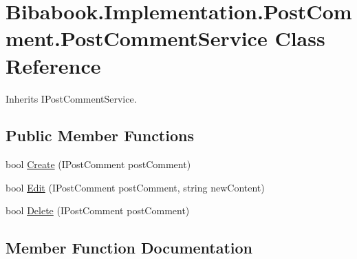\hypertarget{class_bibabook_1_1_implementation_1_1_post_comment_1_1_post_comment_service}{}\section{Bibabook.\+Implementation.\+Post\+Comment.\+Post\+Comment\+Service Class Reference}
\label{class_bibabook_1_1_implementation_1_1_post_comment_1_1_post_comment_service}


Inherits I\+Post\+Comment\+Service.

\subsection*{Public Member Functions}
\begin{DoxyCompactItemize}
\item 
bool \hyperlink{class_bibabook_1_1_implementation_1_1_post_comment_1_1_post_comment_service_a69d9cb1bd34cc3470638e13307962227}{Create} (I\+Post\+Comment post\+Comment)
\item 
bool \hyperlink{class_bibabook_1_1_implementation_1_1_post_comment_1_1_post_comment_service_a894fd3d726779a8b47086614ab9ac502}{Edit} (I\+Post\+Comment post\+Comment, string new\+Content)
\item 
bool \hyperlink{class_bibabook_1_1_implementation_1_1_post_comment_1_1_post_comment_service_a00809b1cd328b7a733e48d3df9cebd30}{Delete} (I\+Post\+Comment post\+Comment)
\end{DoxyCompactItemize}


\subsection{Member Function Documentation}
\hypertarget{class_bibabook_1_1_implementation_1_1_post_comment_1_1_post_comment_service_a69d9cb1bd34cc3470638e13307962227}{}

